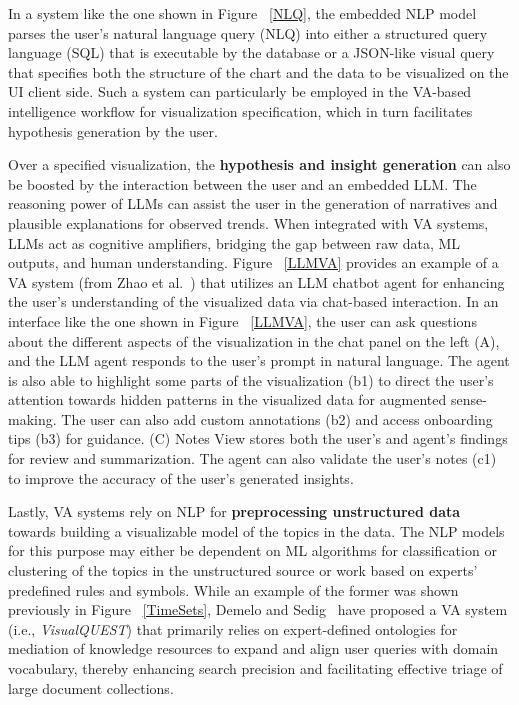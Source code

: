 \documentclass{sfuthesis}
\begin{document}
In a system like the one shown in Figure ~\ref{NLQ}, the embedded NLP model parses the user’s natural language query (NLQ) into either a structured query language (SQL) that is executable by the database or a JSON-like visual query that specifies both the structure of the chart and the data to be visualized on the UI client side. Such a system can particularly be employed in the VA-based intelligence workflow for visualization specification, which in turn facilitates hypothesis generation by the user.\par
Over a specified visualization, the \textbf{hypothesis and insight generation} can also be boosted by the interaction between the user and an embedded LLM. The reasoning power of LLMs can assist the user in the generation of narratives and plausible explanations for observed trends. When integrated with VA systems, LLMs act as cognitive amplifiers, bridging the gap between raw data, ML outputs, and human understanding. Figure ~\ref{LLMVA} provides an example of a VA system (from Zhao et al.~\cite{zhao2025proactiveva}) that utilizes an LLM chatbot agent for enhancing the user’s understanding of the visualized data via chat-based interaction. In an interface like the one shown in Figure ~\ref{LLMVA}, the user can ask questions about the different aspects of the visualization in the chat panel on the left (A), and the LLM agent responds to the user's prompt in natural language. The agent is also able to highlight some parts of the visualization (b1) to direct the user’s attention towards hidden patterns in the visualized data for augmented sense-making. The user can also add custom annotations (b2) and access onboarding tips (b3) for guidance. (C) Notes View stores both the user's and agent's findings for review and summarization. The agent can also validate the user's notes (c1) to improve the accuracy of the user's generated insights.\par 

Lastly, VA systems rely on NLP for \textbf{preprocessing unstructured data} towards building a visualizable model of the topics in the data. The NLP models for this purpose may either be dependent on ML algorithms for classification or clustering of the topics in the unstructured source or work based on experts’ predefined rules and symbols. While an example of the former was shown previously in Figure ~\ref{TimeSets}, Demelo and Sedig~\cite{demelo2021interfaces} have proposed a VA system (i.e., \textit{VisualQUEST}) that primarily relies on expert-defined ontologies for mediation of knowledge resources to expand and align user queries with domain vocabulary, thereby enhancing search precision and facilitating effective triage of large document collections.
\end{document}
